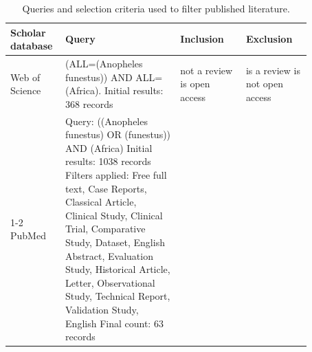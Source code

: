 \documentclass{article}
\begin{document}
\begin{table}[ht]
\centering
\caption{Queries and selection criteria used to filter published literature.}\label{tab:data_collection}
\small
\begin{tabular}{p{0.12\linewidth}|p{0.35\linewidth}|p{0.2\linewidth}|p{0.2\linewidth}}
\toprule
\textbf{Scholar database} & \textbf{Query} & \textbf{Inclusion} & \textbf{Exclusion} \\
\midrule
Web of Science & (ALL=(Anopheles funestus)) AND ALL=(Africa). Initial results: 368 records & \* not a review \* is open access & \* is a review \* is not open access \\
\cmidrule(lr){1-2}
PubMed & Query: ((Anopheles funestus) OR (funestus)) AND (Africa) \* Initial results: 1038 records \* Filters applied: Free full text, Case Reports, Classical Article, Clinical Study, Clinical Trial, Comparative Study, Dataset, English Abstract, Evaluation Study, Historical Article, Letter, Observational Study, Technical Report, Validation Study, English \* Final count: 63 records & & \\
\bottomrule
\end{tabular}
\end{table}
\end{document}
